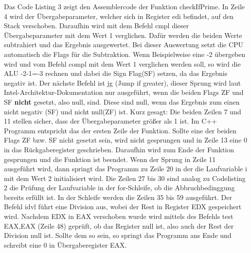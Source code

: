 \documentclass[12pt]{article}
\begin{document}
Das Code Listing 3 zeigt den Assemblercode der Funktion checkIfPrime. In Zeile 4 wird der Übergabeparameter, welcher sich in Register edi befindet, auf den Stack verschoben. Daraufhin wird mit dem Befehl cmpl dieser Übergabeparameter mit dem Wert 1 verglichen. Dafür werden die beiden Werte subtrahiert und das Ergebnis ausgewertet. Bei dieser Auswertung setzt die CPU automatisch die Flags für die Subtraktion. Wenn Beispielweise eine -2 übergeben wird und vom Befehl compl mit dem Wert 1 verglichen werden soll, so wird die ALU -2-1=-3 rechnen und dabei die Sign Flag(SF) setzen, da das Ergebnis negativ ist. Der nächste Befehl ist jg (Jump if greater), dieser Sprung wird laut Intel-Architektur-Dokumentation nur ausgeführt, wenn die beiden Flags ZF und SF \textbf{nicht} gesetzt, also null, sind. Diese sind null, wenn das Ergebnis zum einen nicht negativ (SF) und nicht null(ZF) ist. \newline Kurz gesagt: Die beiden Zeilen 7 und 11 stellen sicher, dass der Übergabeparameter größer als 1 ist. Im C++ Programm entspricht das der ersten Zeile der Funktion. Sollte eine der beiden Flags ZF bzw. SF nicht gesetzt sein, wird nicht gesprungen und in Zeile 13 eine 0 in das Rückgaberegister geschrieben. Daraufhin wird zum Ende der Funktion gesprungen und die Funktion ist beendet. Wenn der Sprung in Zeile 11 ausgeführt wird, dann springt das Programm zu Zeile 20 in der die Laufvariable i  mit dem Wert 2 initialisiert wird. Die Zeilen 27 bis 30 sind analog zu Codelisting 2 die Prüfung der Laufvariable in der for-Schleife, ob die Abbruchbedinggung bereits erfüllt ist. In der Schleife werden die Zeilen 35 bis 59 ausgeführt. Der Befehl idvl führt eine Division aus, wobei der Rest in Register EDX gespeichert wird. Nachdem EDX in EAX verschoben wurde wird mittels des Befehls test EAX,EAX (Zeile 48) geprüft, ob das Register null ist, also auch der Rest der Division null ist. Sollte dem so sein, so springt das Programm ans Ende und schreibt eine 0 in Übergaberegister EAX.


\newpage

\end{document}
